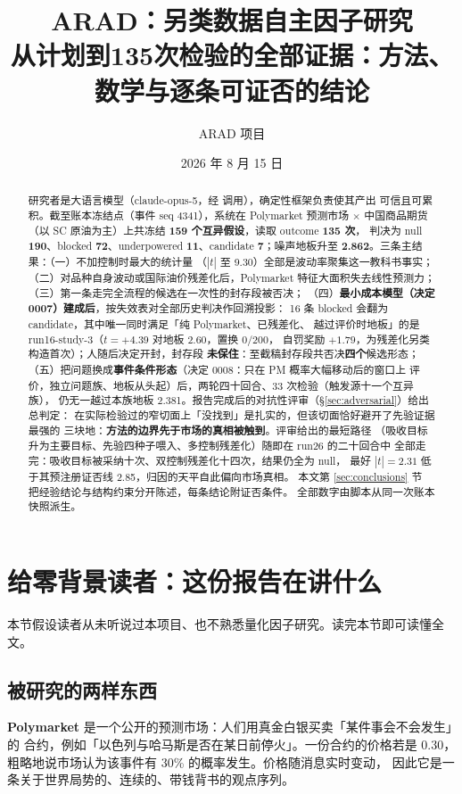\documentclass[11pt]{ctexart}
\title{\textbf{ARAD：另类数据自主因子研究}\\
\large 从计划到135次检验的全部证据：方法、数学与逐条可证否的结论}
\author{ARAD 项目}
\date{2026 年 8 月 15 日}
\begin{document}
\maketitle
\begin{abstract}
研究者是大语言模型（claude-opus-5，经  调用），确定性框架负责使其产出
可信且可累积。截至账本冻结点（事件 seq 4341），系统在
Polymarket 预测市场 $\times$ 中国商品期货（以 SC 原油为主）上共冻结 \textbf{159 个互异假设}，读取 outcome \textbf{135 次}，
判决为 null \textbf{190}、blocked \textbf{72}、underpowered \textbf{11}、candidate \textbf{7}；噪声地板升至 \textbf{2.862}。三条主结果：（一）不加控制时最大的统计量
（$|t|$ 至 9.30）全部是波动率聚集这一教科书事实；
（二）对品种自身波动或国际油价残差化后，Polymarket 特征大面积失去线性预测力；
（三）第一条走完全流程的候选在一次性的封存段被否决；
（四）\textbf{最小成本模型（决定 0007）建成后}，按失效表对全部历史判决作回溯投影：
16 条 blocked 会翻为 candidate，其中唯一同时满足「纯 Polymarket、已残差化、
越过评价时地板」的是 run16-study-3（$t=+4.39$ 对地板 $2.60$，置换 $0/200$，
自罚奖励 $+1.79$，为残差化另类构造首次）；人随后决定开封，封存段
\textbf{未保住}：至截稿封存段共否决\textbf{四个}候选形态；
（五）把问题换成\textbf{事件条件形态}（决定 0008：只在 PM 概率大幅移动后的窗口上
评价，独立问题族、地板从头起）后，两轮四十回合、33 次检验（触发源十一个互异族），
仍无一越过本族地板 2.381。报告完成后的对抗性评审（\S\ref{sec:adversarial}）给出总判定：
在实际检验过的窄切面上「没找到」是扎实的，但该切面恰好避开了先验证据最强的
三块地：\textbf{方法的边界先于市场的真相被触到}。评审给出的最短路径
（吸收目标升为主要目标、先验四种子喂入、多控制残差化）随即在 run26 的二十回合中
全部走完：吸收目标被采纳十次、双控制残差化十四次，结果仍全为 null，
最好 $|t|=2.31$ 低于其预注册证否线 2.85，归因的天平自此偏向市场真相。
本文第 \ref{sec:conclusions} 节
把经验结论与结构约束分开陈述，每条结论附证否条件。
全部数字由脚本从同一次账本快照派生。
\end{abstract}
\tableofcontents

\section{给零背景读者：这份报告在讲什么}\label{sec:primer}
本节假设读者从未听说过本项目、也不熟悉量化因子研究。读完本节即可读懂全文。

\subsection{被研究的两样东西}
\textbf{Polymarket} 是一个公开的预测市场：人们用真金白银买卖「某件事会不会发生」的
合约，例如「以色列与哈马斯是否在某日前停火」。一份合约的价格若是 0.30，
粗略地说市场认为该事件有 30\% 的概率发生。价格随消息实时变动，
因此它是一条关于世界局势的、连续的、带钱背书的观点序列。
\end{document}
